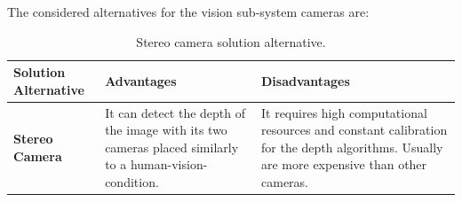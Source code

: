 \documentclass[11pt]{report} %
\begin{document}
The considered alternatives for the vision sub-system cameras are:\\


\begin{table}[H]
\begin{center}
    \begin{tabular}{M{6.6cm}M{3.3cm}M{3.3cm}}
    \hline
    \textbf{Solution Alternative} & \textbf{Advantages} & \textbf{Disadvantages} \\ 
    \hline
    
    \textbf{Stereo Camera}

    
    \citep{cite_stereo_camera_zed}

    &
    
    It can detect the depth of the image with its two cameras placed similarly to a human-vision-condition.
    
    &
    
    It requires high computational resources and constant calibration for the depth algorithms. Usually are more expensive than other cameras.
    
    \\ \hline
    \end{tabular}
\caption{\label{tab:stereo} Stereo camera solution alternative.}
\end{center}
\end{table}
\end{document}
